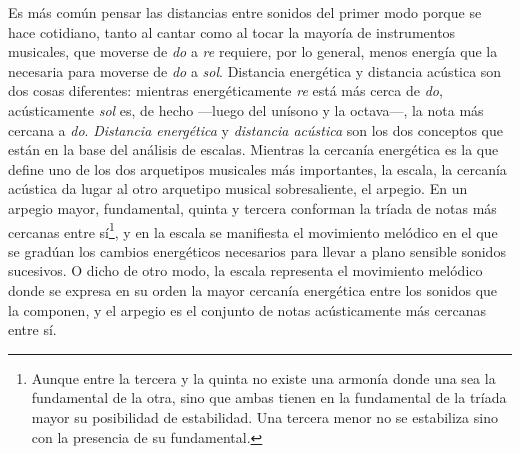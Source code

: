 \documentclass[a4paper,11pt]{article}
\begin{document}
\begin{multicols}{2}
  Es más común pensar las distancias entre sonidos del primer modo porque se hace cotidiano, tanto al cantar como al tocar la mayoría de instrumentos musicales, que moverse de \emph{do} a \emph{re} requiere, por lo general, menos energía que la necesaria para moverse de \emph{do} a \emph{sol}. Distancia energética y distancia acústica son dos cosas diferentes: mientras energéticamente \emph{re} está más cerca de \emph{do}, acústicamente \emph{sol} es, de hecho ---luego del unísono y la \hbox{octava---,} la nota más cercana a \emph{do}. \emph{Distancia energética} y \emph{distancia acústica} son los dos conceptos que están en la base del análisis de escalas. Mientras la cercanía energética es la que define uno de los dos arquetipos musicales más importantes, la escala, la cercanía acústica da lugar al otro arquetipo musical sobresaliente, el arpegio. En un arpegio mayor, fundamental, quinta y tercera conforman la tríada de notas más cercanas entre sí\footnote{Aunque entre la tercera y la quinta no existe una armonía donde una sea la fundamental de la otra, sino que ambas tienen en la fundamental de la tríada mayor su posibilidad de estabilidad. Una tercera menor no se estabiliza sino con la presencia de su fundamental.}, y en la escala se manifiesta el movimiento melódico en el que se gradúan los cambios energéticos necesarios para llevar a plano sensible sonidos sucesivos. O dicho de otro modo, la escala representa el movimiento melódico donde se expresa en su orden la mayor cercanía energética entre los sonidos que la componen, y el arpegio es el conjunto de notas acústicamente más cercanas entre sí.
\end{multicols}
\end{document}
